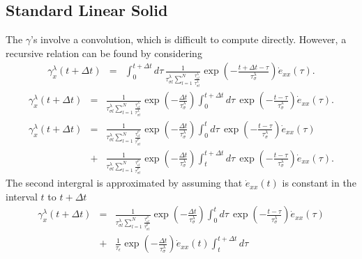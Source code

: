 \documentclass[11pt]{article}
\begin{document}
{\subsection*{Standard Linear Solid}
The $\gamma$'s involve a convolution, which is difficult to compute directly.
However, a recursive relation can be found by considering
\begin{eqnarray*}
\gamma^{\lambda}_x(t+\Delta t) & = &
  \int^{t+\Delta t}_0 d\tau\,
  \frac{1}{\tau^{\lambda}_{\sigma l}
   {\sum_{l=1}^N \frac{\tau^{\lambda}_{\epsilon l}}
   {\tau^{\lambda}_{\sigma l}}} }
  \exp(-\frac{t+\Delta t -\tau}{\tau^{\lambda}_{\sigma}})
  \dot{e}_{xx}(\tau).
\end{eqnarray*}
\begin{eqnarray*}
\gamma^{\lambda}_x(t+\Delta t) & = &
  \frac{1}{\tau^{\lambda}_{\sigma l}{\sum_{l=1}^N \frac{\tau^{\lambda}_{\epsilon l}}{\tau^{\lambda}_{\sigma l}}} }
  \exp(-\frac{\Delta t}{\tau^{\lambda}_{\sigma}})
  \int^{t+\Delta t}_{0} d\tau\,
  \exp(-\frac{t-\tau}{\tau^{\lambda}_{\sigma}})
  \dot{e}_{xx}(\tau).
\end{eqnarray*}
\begin{eqnarray*}
\gamma^{\lambda}_x(t+\Delta t) 
 & = & 
  \frac{1}{\tau^{\lambda}_{\sigma l}\sum_{l=1}^N \frac{\tau^{\rho}_{\epsilon l}}{\tau^{\rho}_{\sigma l}}}
  \exp(-\frac{\Delta t}{\tau^{\lambda}_{\sigma}})
  \int^{t}_0 d\tau\,
  \exp(-\frac{t-\tau}{\tau^{\lambda}_{\sigma}})
  \dot{e}_{xx}(\tau)\\
 & + &
  \frac{1}{\tau^{\lambda}_{\sigma l}\sum_{l=1}^N \frac{\tau^{\rho}_{\epsilon l}}{\tau^{\rho}_{\sigma l}}}
  \exp(-\frac{\Delta t}{\tau^{\lambda}_{\sigma}})
  \int^{t+\Delta t}_t d\tau\,
  \exp(-\frac{t-\tau}{\tau^{\lambda}_{\sigma}})
  \dot{e}_{xx}(\tau).
\end{eqnarray*}
The second intergral is approximated by
 assuming that $\dot{e}_{xx}(t)$ is constant in the interval $t$ to $t+\Delta t$
\begin{eqnarray*}
\gamma^{\lambda}_x(t+\Delta t) 
 & = & %
  \frac{1}{\tau^{\lambda}_{\sigma l}\sum_{l=1}^N \frac{\tau^{\rho}_{\epsilon l}}{\tau^{\rho}_{\sigma l}}}
\exp(-\frac{\Delta t}{\tau^{\lambda}_{\sigma}})
       \int^{t}_0 d\tau\,
       \exp(-\frac{t-\tau}{\tau^{\lambda}_{\sigma}})
       \dot{e}_{xx}(\tau)\\
 & + &
       \frac{1}{\tau_{\epsilon}} \exp(-\frac{\Delta t}{\tau^{\lambda}_{\sigma}})
       \dot{e}_{xx}(t)\int^{t+\Delta t}_t d\tau\,

\end{eqnarray*}}
\end{document}
